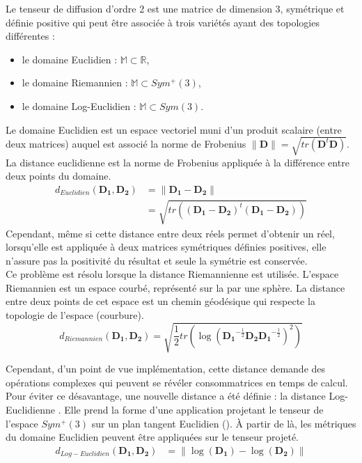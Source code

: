 Le tenseur de diffusion d'ordre 2 est une matrice de dimension 3, symétrique et définie positive 
qui peut être associée à trois variétés ayant des topologies différentes :
\begin{itemize}
    \item le domaine Euclidien : $\mathbb{M} \subset \mathbb{R}$,
    \item le domaine Riemannien : $\mathbb{M} \subset Sym^+(3)$,
    \item le domaine Log-Euclidien : $\mathbb{M} \subset Sym(3)$.\\
\end{itemize}

Le domaine Euclidien est un espace vectoriel muni d'un produit scalaire (entre deux matrices)
auquel est associé la norme de Frobenius $\|\mathbf{D}\|=\sqrt{tr(\mathbf{D}^t\mathbf{D})}$.
La distance euclidienne est la norme de Frobenius appliquée à la différence entre deux points du domaine.
\begin{align}
    d_{Euclidien}(\mathbf{D_1}, \mathbf{D_2}) &= \|\mathbf{D_1}-\mathbf{D_2} \| \nonumber \\
    &= \sqrt{tr((\mathbf{D_1}-\mathbf{D_2})^t(\mathbf{D_1}-\mathbf{D_2}))}
\end{align}
Cependant, même si cette distance entre deux réels permet d'obtenir un réel,
lorsqu'elle est appliquée à deux matrices symétriques définies positives, 
elle n'assure pas la positivité du résultat et seule la symétrie est conservée.\\

Ce problème est résolu lorsque la distance Riemannienne \cite{Pennec2006, Fletcher2007} est utilisée.
L'espace Riemannien est un espace courbé, représenté sur la  par une sphère.
La distance entre deux points de cet espace est un chemin géodésique qui respecte la topologie de l'espace (courbure).
\begin{equation}
    d_{Riemannien}(\mathbf{D_1}, \mathbf{D_2}) = \sqrt{\frac{1}{2} tr\left(\log \left(\mathbf{D_1}^{-\frac{1}{2}}\mathbf{D_2}\mathbf{D_1}^{-\frac{1}{2}} \right)^2 \right)}
\end{equation}


Cependant, d'un point de vue implémentation, cette distance demande des opérations complexes qui peuvent se révéler consommatrices en temps de calcul.
Pour éviter ce désavantage, une nouvelle distance a été définie : la distance Log-Euclidienne \cite{Arsigny2006}.
Elle prend la forme d'une application projetant le tenseur de l'espace $Sym^+(3)$ sur un plan tangent Euclidien ().
À partir de là, les métriques du domaine Euclidien peuvent être appliquées sur le tenseur projeté.
\begin{align}
    d_{Log-Euclidien}(\mathbf{D_1}, \mathbf{D_2}) &= \|\log \left(\mathbf{D_1}\right)- \log \left(\mathbf{D_2}\right) \|
\end{align}




